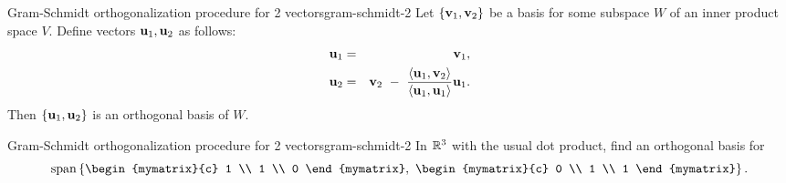 \begin{proposition}{Gram-Schmidt orthogonalization procedure for 2 vectors}{gram-schmidt-2}
  Let $\set{\vect{v}_1,\vect{v}_2}$ be a basis for some subspace $W$
  of an inner product space $V$. Define vectors
  $\vect{u}_1,\vect{u}_2$ as follows:
  \begin{eqnarray*}
    \vect{u}_1 &=& \vect{v}_1, \\
    \vect{u}_2 &=& \vect{v}_2 ~-~ \frac{\iprod{\vect{u}_1,\vect{v}_2}}{\iprod{\vect{u}_1,\vect{u}_1}}\vect{u}_1.
  \end{eqnarray*}
  Then $\set{\vect{u}_1,\vect{u}_2}$ is an orthogonal basis of $W$.
\end{proposition}

\begin{example}{Gram-Schmidt orthogonalization procedure for 2 vectors}{gram-schmidt-2}
  In $\mathbb{R}^3$ with the usual dot product, find an orthogonal basis for
  \begin{equation*}
    \sspan\set{
      \begin{mymatrix}{c} 1 \\ 1 \\ 0 \end{mymatrix},~
      \begin{mymatrix}{c} 0 \\ 1 \\ 1 \end{mymatrix}
    }.
  \end{equation*}
\end{example}

